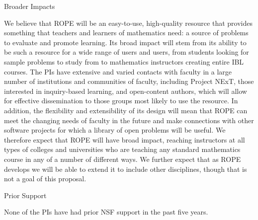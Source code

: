 \documentclass[11pt]{article}
\begin{document}


\begin{section}{Broader Impacts}

We believe that ROPE will be an easy-to-use, high-quality resource that
provides something that teachers and learners of mathematics need: a
source of problems to evaluate and promote learning.  Its broad impact
will stem from its ability to be such a resource for a wide range of users
and users, from students looking for sample problems to study from to
mathematics instructors creating entire IBL courses.  The PIs have
extensive and varied contacts with faculty 
in a large number of institutions and communities of faculty,
including Project NExT, those interested in inquiry-based learning, and
open-content authors, which will allow for effective dissemination to those 
groups most likely to use the resource.  
In addition, the flexibility and
extensibility of its design will mean that ROPE can meet the changing
needs of faculty in the future and make connections with other software
projects for which a library of open problems will be useful.  We
therefore expect that ROPE will have broad impact, reaching instructors at
all types of colleges and universities who are teaching any standard
mathematics course in any of a number of different ways.  We further
expect that as ROPE develops we will be able to extend it to include other
disciplines, though that is not a goal of this proposal.
\end{section}

\begin{section}{Prior Support}

None of the PIs have had prior NSF support in the past five years.

\end{section}
\end{document}
